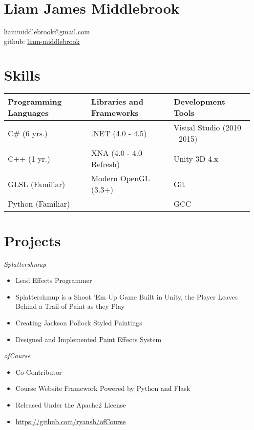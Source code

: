 \documentclass[line,margin]{res}
\begin{document}
\marginsize{.5in}{.5in}{1.0in}{.5in}

\section{Liam James Middlebrook}

\href{mailto:liammiddlebrook@gmail.com}{liammiddlebrook@gmail.com}\\
github: \href{https://github.com/liam-middlebrook}{liam-middlebrook}

\begin{resume}


\section{Skills}
\begin{table}[h]
\begin{tabular}{@{}lll@{}}
\toprule
Programming Languages & Libraries and Frameworks & Development Tools           \\ \midrule
C\# (6 yrs.)          & .NET (4.0 - 4.5)         & Visual Studio (2010 - 2015) \\
C++ (1 yr.)           & XNA (4.0 - 4.0 Refresh)  & Unity 3D 4.x                \\
GLSL (Familiar)       & Modern OpenGL (3.3+)     & Git                         \\
Python (Familiar)     &                          & GCC                         \\ \bottomrule
\end{tabular}
\end{table}


\section{Projects}

{\sl Splattershmup}
\begin{itemize}
\itemsep1pt\parskip0pt
\item
Lead Effects Programmer
\item
Splattershmup is a Shoot 'Em Up Game Built in Unity, the Player Leaves Behind a Trail of Paint as they Play
\item
Creating Jackson Pollock Styled Paintings
\item
Designed and Implemented Paint Effects System
\end{itemize}

{\sl ofCourse}
\begin{itemize}
\itemsep1pt\parskip0pt
\item
Co-Contributor
\item
Course Website Framework Powered by Python and Flask
\item
Released Under the Apache2 License
\item
\url{https://github.com/ryansb/ofCourse}
\end{itemize}


\end{resume}
\end{document}
